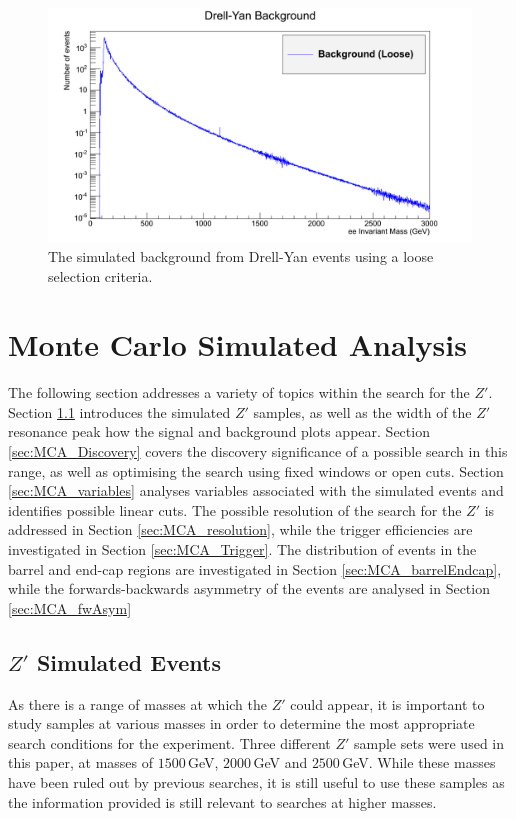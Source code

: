 \documentclass{article}
\begin{document}
\begin{figure}[h]
    \centering
    \includegraphics[scale=0.25]{images/DYBackground.png}
    \caption{The simulated background from Drell-Yan events using a loose selection criteria. \label{fig:DYBackground}}
\end{figure}

\section{Monte Carlo Simulated Analysis}
\label{sec:MonteCarloSimulatedAnalysis}

The following section addresses a variety of topics within the search for the $Z'$. Section \ref{sec:MCA_ZPrime} introduces the simulated $Z'$ samples, as well as the width of the $Z'$ resonance peak how the signal and background plots appear. Section \ref{sec:MCA_Discovery} covers the discovery significance of a possible search in this range, as well as optimising the search using fixed windows or open cuts. Section \ref{sec:MCA_variables} analyses variables associated with the simulated events and identifies possible linear cuts. The possible resolution of the search for the $Z'$ is addressed in Section \ref{sec:MCA_resolution}, while the trigger efficiencies are investigated in Section \ref{sec:MCA_Trigger}. The distribution of events in the barrel and end-cap regions are investigated in Section \ref{sec:MCA_barrelEndcap}, while the forwards-backwards asymmetry of the events are analysed in Section \ref{sec:MCA_fwAsym}

\subsection{$Z'$ Simulated Events}
\label{sec:MCA_ZPrime} 
 
As there is a range of masses at which the $Z'$ could appear, it is important to study samples at various masses in order to determine the most appropriate search conditions for the experiment. Three different $Z'$ sample sets were used in this paper, at masses of $1500\,$GeV, $2000\,$GeV and $2500\,$GeV. While these masses have been ruled out by previous searches, it is still useful to use these samples as the information provided is still relevant to searches at higher masses. 
\end{document}
